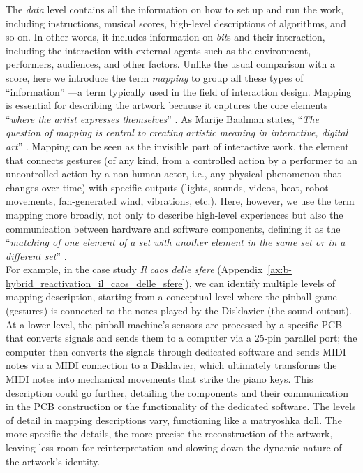 The \textit{data} level contains all the information on how to set up and run the work, including instructions, musical scores, high-level descriptions of algorithms, and so on. In other words, it includes information on \textit{bit}s and their interaction, including the interaction with external agents such as the environment, performers, audiences, and other factors. Unlike the usual comparison with a score, here we introduce the term \textit{mapping} to group all these types of ``information'' —a term typically used in the field of interaction design. Mapping is essential for describing the artwork because it captures the core elements ``\textit{where the artist expresses themselves}'' \cite{baalman2022composing}. As Marije Baalman states, ``\textit{The question of mapping is central to creating artistic meaning in interactive, digital art}'' \cite{baalman2022composing}. Mapping can be seen as the invisible part \cite{delahunta2001invisibility} of interactive work, the element that connects gestures (of any kind, from a controlled action by a performer to an uncontrolled action by a non-human actor, i.e., any physical phenomenon that changes over time) with specific outputs (lights, sounds, videos, heat, robot movements, fan-generated wind, vibrations, etc.). Here, however, we use the term mapping more broadly, not only to describe high-level experiences but also the communication between hardware and software components, defining it as the ``\textit{matching of one element of a set with another element in the same set or in a different set}'' \cite{winkler2001composing}.\\
For example, in the case study \textit{Il caos delle sfere} (Appendix~\ref{ax:b-hybrid_reactivation_il_caos_delle_sfere}), we can identify multiple levels of mapping description, starting from a conceptual level where the pinball game (gestures) is connected to the notes played by the Disklavier (the sound output). At a lower level, the pinball machine's sensors are processed by a specific PCB that converts signals and sends them to a computer via a 25-pin parallel port; the computer then converts the signals through dedicated software and sends MIDI notes via a MIDI connection to a Disklavier, which ultimately transforms the MIDI notes into mechanical movements that strike the piano keys. This description could go further, detailing the components and their communication in the PCB construction or the functionality of the dedicated software. The levels of detail in mapping descriptions vary, functioning like a matryoshka doll. The more specific the details, the more precise the reconstruction of the artwork, leaving less room for reinterpretation and slowing down the dynamic nature of the artwork's identity.\\
